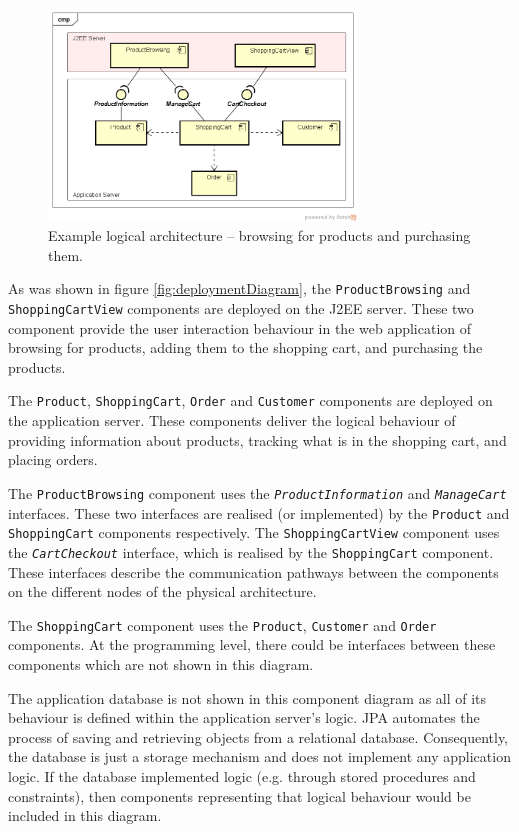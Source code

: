 \begin{figure}[h]
    \centering
    \includegraphics[trim=40 40 23 50,clip,width=0.73\textwidth]{images/uml/component_diagram.png}
    \caption{Example logical architecture -- browsing for products and purchasing them.}
    \label{fig:componentDiagram}
\end{figure}

As was shown in figure \ref{fig:deploymentDiagram},
the \texttt{ProductBrowsing} and \texttt{ShoppingCartView} components are deployed on the J2EE server.
These two component provide the user interaction behaviour in the web application
of browsing for products, adding them to the shopping cart, and purchasing the products.

The \texttt{Product}, \texttt{ShoppingCart}, \texttt{Order} and \texttt{Customer} components are deployed on the application server.
These components deliver the logical behaviour of providing information about products, tracking what is in the shopping cart, and placing orders.

The \texttt{ProductBrowsing} component uses the \texttt{\textsl{ProductInformation}} and \texttt{\textsl{ManageCart}} interfaces.
These two interfaces are realised (or implemented) by the \texttt{Product} and \texttt{ShoppingCart} components respectively.
The \texttt{ShoppingCartView} component uses the \texttt{\textsl{CartCheckout}} interface, which is realised by the \texttt{ShoppingCart} component.
These interfaces describe the communication pathways between the components on the different nodes of the physical architecture.

The \texttt{ShoppingCart} component uses the \texttt{Product}, \texttt{Customer} and \texttt{Order} components.
At the programming level, there could be interfaces between these components which are not shown in this diagram.

\noindent
The application database is not shown in this component diagram as all of its behaviour is defined within the application server's logic.
JPA automates the process of saving and retrieving objects from a relational database.
Consequently, the database is just a storage mechanism and does not implement any application logic.
If the database implemented logic (e.g. through stored procedures and constraints),
then components representing that logical behaviour would be included in this diagram.

